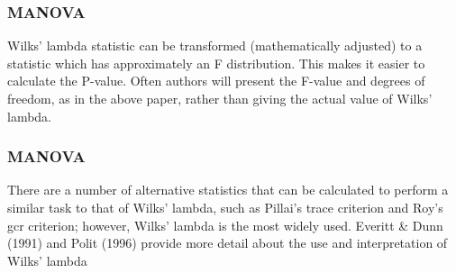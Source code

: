 \documentclass{beamer}
\begin{document}
		\begin{frame}
			\frametitle{MANOVA}
			Wilks' lambda statistic can be transformed (mathematically adjusted) to a
			statistic which has approximately an F distribution. This makes it easier to
			calculate the P-value. Often authors will present the F-value and degrees of
			freedom, as in the above paper, rather than giving the actual value of Wilks'
			lambda.
			
		\end{frame}
		\begin{frame}
			\frametitle{MANOVA}
			There are a number of alternative statistics that can be calculated to
			perform a similar task to that of Wilks' lambda, such as Pillai's trace criterion
			and Roy's gcr criterion; however, Wilks' lambda is the most widely used.
			Everitt \& Dunn (1991) and Polit (1996) provide more detail about the use
			and interpretation of Wilks' lambda
		\end{frame}
		
	
\end{document}
